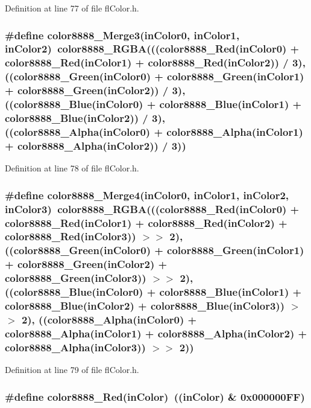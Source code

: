 Definition at line 77 of file fl\-Color.h.
\subsubsection{\setlength{\rightskip}{0pt plus 5cm}\#define color8888\_\-Merge3(in\-Color0, in\-Color1, in\-Color2)~color8888\_\-RGBA(((color8888\_\-Red(in\-Color0) + color8888\_\-Red(in\-Color1) + color8888\_\-Red(in\-Color2)) / 3), ((color8888\_\-Green(in\-Color0) + color8888\_\-Green(in\-Color1) + color8888\_\-Green(in\-Color2)) / 3), ((color8888\_\-Blue(in\-Color0) + color8888\_\-Blue(in\-Color1) + color8888\_\-Blue(in\-Color2)) / 3), ((color8888\_\-Alpha(in\-Color0) + color8888\_\-Alpha(in\-Color1) + color8888\_\-Alpha(in\-Color2)) / 3))}\label{flColor_8h_1102cbb8e20fbccdc9ec9aa09ee755b1}




Definition at line 78 of file fl\-Color.h.
\subsubsection{\setlength{\rightskip}{0pt plus 5cm}\#define color8888\_\-Merge4(in\-Color0, in\-Color1, in\-Color2, in\-Color3)~color8888\_\-RGBA(((color8888\_\-Red(in\-Color0) + color8888\_\-Red(in\-Color1) + color8888\_\-Red(in\-Color2) + color8888\_\-Red(in\-Color3)) $>$$>$ 2), ((color8888\_\-Green(in\-Color0) + color8888\_\-Green(in\-Color1) + color8888\_\-Green(in\-Color2) + color8888\_\-Green(in\-Color3)) $>$$>$ 2), ((color8888\_\-Blue(in\-Color0) + color8888\_\-Blue(in\-Color1) + color8888\_\-Blue(in\-Color2) + color8888\_\-Blue(in\-Color3)) $>$$>$ 2), ((color8888\_\-Alpha(in\-Color0) + color8888\_\-Alpha(in\-Color1) + color8888\_\-Alpha(in\-Color2) + color8888\_\-Alpha(in\-Color3)) $>$$>$ 2))}\label{flColor_8h_2a3e218aaea8b2a1027c269be349622b}




Definition at line 79 of file fl\-Color.h.
\subsubsection{\setlength{\rightskip}{0pt plus 5cm}\#define color8888\_\-Red(in\-Color)~((in\-Color) \& 0x000000FF)}\label{flColor_8h_8e6b43835a4cca887aeddf15486e82e7}





